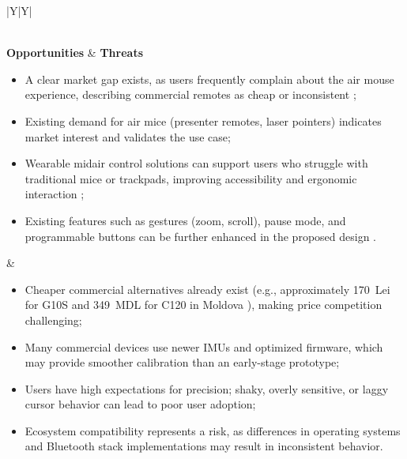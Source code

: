 \begin{table}[H]
\begin{tabularx}{\textwidth}{|Y|Y|}
\begin{itemize}[leftmargin=*, labelsep=0.4em]
\end{itemize}
\\
\hline
\textbf{Opportunities} & \textbf{Threats} \\
\hline
\begin{itemize}[leftmargin=*, labelsep=0.4em]
    \item A clear market gap exists, as users frequently complain about the air mouse experience, describing commercial remotes as cheap or inconsistent \cite{reddit_airmouse_discussion};
    \item Existing demand for air mice (presenter remotes, laser pointers) indicates market interest and validates the use case;
    \item Wearable midair control solutions can support users who struggle with traditional mice or trackpads, improving accessibility and ergonomic interaction \cite{acm_airmouse_interface,arxiv_gesture_recognition};
    \item Existing features such as gestures (zoom, scroll), pause mode, and programmable buttons can be further enhanced in the proposed design \cite{gesture_market}.
\end{itemize}
&
\begin{itemize}[leftmargin=*, labelsep=0.4em]
    \item Cheaper commercial alternatives already exist (e.g., approximately 170~Lei for G10S and 349~MDL for C120 in Moldova \cite{antena_airmouse,mshop_airmouse_c120}), making price competition challenging;
    \item Many commercial devices use newer IMUs and optimized firmware, which may provide smoother calibration than an early-stage prototype;
    \item Users have high expectations for precision; shaky, overly sensitive, or laggy cursor behavior can lead to poor user adoption;
    \item Ecosystem compatibility represents a risk, as differences in operating systems and Bluetooth stack implementations may result in inconsistent behavior.
\end{itemize}
\\
\hline
\end{tabularx}
\end{table}









\small
\renewcommand{\arraystretch}{1.25}

